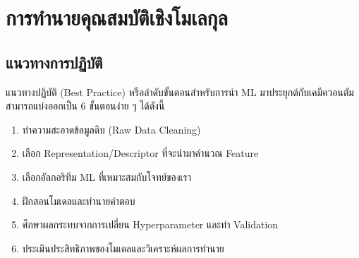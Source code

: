 

\chapter{การทำนายคุณสมบัติเชิงโมเลกุล}
\label{ch:predict_molprop}

\section{แนวทางการปฏิบัติ}

แนวทางปฏิบัติ (Best Practice) หรือลำดับขั้นตอนสำหรับการนำ ML มาประยุกต์กับเคมีควอนตัมสามารถแบ่งออกเป็น 6 ขั้นตอนง่าย ๆ ได้ดังนี้

\begin{enumerate}
    \item ทำความสะอาดข้อมูลดิบ (Raw Data Cleaning)
    \item เลือก Representation/Descriptor ที่จะนำมาคำนวณ Feature 
    \item เลือกอัลกอริทึม ML ที่เหมาะสมกับโจทย์ของเรา 
    \item ฝึกสอนโมเดลและทำนายคำตอบ
    \item ศึกษาผลกระทบจากการเปลี่ยน Hyperparameter และทำ Validation
    \item ประเมินประสิทธิภาพของโมเดลและวิเคราะห์ผลการทำนาย
\end{enumerate}

